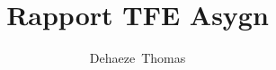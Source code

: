 \documentclass[12pt]{report}
\begin{document}

\title{Rapport TFE Asygn}

\author{Dehaeze~Thomas}

\maketitle

\tableofcontents{}

\listoffigures{}



\newpage

\end{document}
